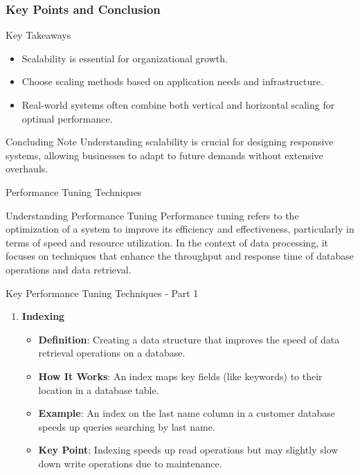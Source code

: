 \documentclass[aspectratio=169]{beamer}
\begin{document}
\begin{frame}[fragile]
    \frametitle{Key Points and Conclusion}
    \begin{block}{Key Takeaways}
        \begin{itemize}
            \item Scalability is essential for organizational growth.
            \item Choose scaling methods based on application needs and infrastructure.
            \item Real-world systems often combine both vertical and horizontal scaling for optimal performance.
        \end{itemize}
    \end{block}
    
    \begin{block}{Concluding Note}
        Understanding scalability is crucial for designing responsive systems, allowing businesses to adapt to future demands without extensive overhauls.
    \end{block}
\end{frame}

\begin{frame}[fragile]{Performance Tuning Techniques}
    \begin{block}{Understanding Performance Tuning}
        Performance tuning refers to the optimization of a system to improve its efficiency and effectiveness, particularly in terms of speed and resource utilization. In the context of data processing, it focuses on techniques that enhance the throughput and response time of database operations and data retrieval.
    \end{block}
\end{frame}

\begin{frame}[fragile]{Key Performance Tuning Techniques - Part 1}
    \begin{enumerate}
        \item \textbf{Indexing}
            \begin{itemize}
                \item \textbf{Definition}: Creating a data structure that improves the speed of data retrieval operations on a database.
                \item \textbf{How It Works}: An index maps key fields (like keywords) to their location in a database table.
                \item \textbf{Example}: An index on the last name column in a customer database speeds up queries searching by last name.
                \item \textbf{Key Point}: Indexing speeds up read operations but may slightly slow down write operations due to maintenance.
            \end{itemize}
    \end{enumerate}
\end{frame}
\end{document}
